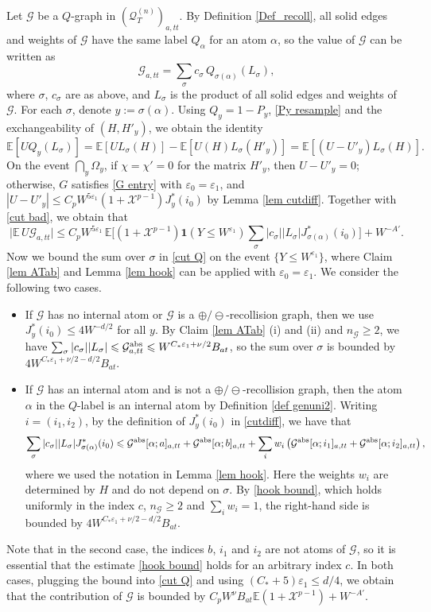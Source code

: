 \documentclass{article}
\newcommand{\1}{\mathds{1}}
\numberwithin{equation}{section}
\newcommand{\al}{\alpha}
\newcommand{\be}{\begin{equation}}
\newcommand{\ee}{\end{equation}}
\newcommand{\e}{{\varepsilon}}
\renewcommand{\cal}{\mathcal}
\renewcommand{\leq}{\leqslant}
\renewcommand{\geq}{\geqslant}
\renewcommand{\le}{\leq}
\renewcommand{\ge}{\geq}
\newcommand{\E}{\mathbb{E}}
\theoremstyle{plain} %
\theoremstyle{remark}
\newcommand{\QTn}{\mathcal Q_T^{(n)}}
\begin{document}
\medskip
{} Let $\cal G$ be a $Q$-graph in $(\QTn)_{a,tt}$. By Definition \ref{Def_recoll}, all solid edges and weights of $\cal G$ have the same label $Q_\al$ for an atom $\al$, so the value of $\cal G$ can be written as
$$\cal G_{a,tt}=\sum_{\sigma}c_\sigma\, Q_{\sigma(\al)}\left(L_\sigma\right),$$
where $\sigma$, $c_\sigma$ are as above, and $L_\sigma$ is the product of all solid edges and weights of $\cal G$. For each $\sigma$, denote $y:=\sigma(\al)$. Using $Q_y=1-P_y$, \eqref{Py resample} and the exchangeability of $(H,H'_y)$, we obtain the identity
\be\label{cut exch}
\E\left[U Q_y(L_\sigma)\right]=\E\left[U L_\sigma(H)\right]-\E\left[U(H) L_\sigma(H'_y)\right]=\E\left[(U-U'_y)L_\sigma(H)\right].
\ee
On the event $\bigcap_y\Omega_y$, if $\chi=\chi'=0$ for the matrix $H'_y$, then $U-U'_y=0$; otherwise, $G$ satisfies \eqref{G entry} with $\e_0=\e_1$, and $|U-U'_y|\le C_pW^{5\e_1}(1+\cal X^{p-1})J^*_y(i_0)$ by Lemma \ref{lem cutdiff}. Together with \eqref{cut bad}, we obtain that
\be\label{cut Q}
\Big|\E\,U\cal G_{a,tt}\Big|\le C_pW^{5\e_1}\,\E\Big[\left(1+\cal X^{p-1}\right)\mathbf 1(Y\le W^{\e_1})\sum_\sigma|c_\sigma||L_\sigma|J^*_{\sigma(\al)}(i_0)\Big]+W^{-A'}.
\ee
Now we bound the sum over $\sigma$ in \eqref{cut Q} on the event $\{Y\le W^{\e_1}\}$, where Claim \ref{lem ATab} and Lemma \ref{lem hook} can be applied with $\e_0=\e_1$. We consider the following two cases.
\begin{itemize}
\item If $\cal G$ has no internal atom or $\cal G$ is a $\oplus/\ominus$-recollision graph, then we use $J^*_y(i_0)\le 4W^{-d/2}$ for all $y$. By Claim \ref{lem ATab} (i) and (ii) and $n_{\cal G}\ge 2$, we have $\sum_\sigma|c_\sigma||L_\sigma|\le \cal G^{\rm abs}_{a,tt}\le W^{C_*\e_1+\nu/2}B_{at}$, so the sum over $\sigma$ is bounded by $4W^{C_*\e_1+\nu/2-d/2}B_{at}$.

\item If $\cal G$ has an internal atom and is not a $\oplus/\ominus$-recollision graph, then the atom $\al$ in the $Q$-label is an internal atom by Definition \ref{def genuni2}. Writing $i=(i_1,i_2)$, by the definition of $J^*_y(i_0)$ in \eqref{cutdiff}, we have that
$$\sum_\sigma|c_\sigma||L_\sigma|J^*_{\sigma(\al)}(i_0)\le \cal G^{\rm abs}[\al;a]_{a,tt}+\cal G^{\rm abs}[\al;b]_{a,tt}+\sum_iw_i\left(\cal G^{\rm abs}[\al;i_1]_{a,tt}+\cal G^{\rm abs}[\al;i_2]_{a,tt}\right),$$
where we used the notation in Lemma \ref{lem hook}. Here the weights $w_i$ are determined by $H$ and do not depend on $\sigma$. By \eqref{hook bound}, which holds uniformly in the index $c$, $n_{\cal G}\ge 2$ and $\sum_i w_i=1$, the right-hand side is bounded by $4W^{C_*\e_1+\nu/2-d/2}B_{at}$.
\end{itemize}
Note that in the second case, the indices $b$, $i_1$ and $i_2$ are not atoms of $\cal G$, so it is essential that the estimate \eqref{hook bound} holds for an arbitrary index $c$. In both cases, plugging the bound into \eqref{cut Q} and using $(C_*+5)\e_1\le d/4$, we obtain that the contribution of $\cal G$ is bounded by $C_pW^{\nu}B_{at}\E(1+\cal X^{p-1})+W^{-A'}$.
\end{document}
